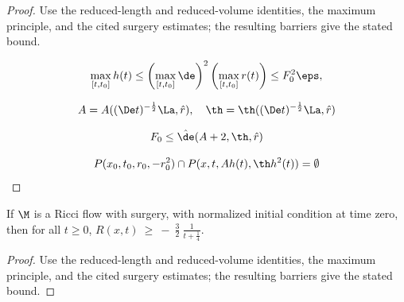 \begin{proof}
\sketch Use the reduced-length and reduced-volume identities, the maximum principle, and the cited surgery estimates; the resulting barriers give the stated bound.

\begin{equation}
\label{h<<r}
\max_{[t,t_0]}h(t)\leq \left(\max_{[t,t_0]}\de\right)^2
\left(\max_{[t,t_0]}r(t)\right)\leq F_0^2\eps,
\end{equation}

\begin{equation}
\label{aandthetaconditions}
A=A((\De t)^{-\frac12}\La,\hat r),\quad
\th=\th((\De t)^{-\frac12}\La,\hat r)
\end{equation}

\begin{equation}
\label{deltasmall}
 F_0\leq \hat\de(A+2,\th,\hat r)
\end{equation}

\begin{equation}
\label{p'sdisjoint}
P(x_0,t_0,r_0,-r_0^2)\cap P(x,t,Ah(t),\th h^2(t))=\emptyset
\end{equation}
\end{proof}

\begin{lemma}
  \label{lem:kl-establishing-noncollapsing-presence-surgery-vanishing-noncollapsing}
 \label{Rev}
If $\M$ is a Ricci flow with surgery, with normalized initial
condition at time zero, then for all $t \ge 0$, $R(x,t) \: \ge \:
- \: \frac{3}{2} \: \frac{1}{t+\frac14}$.
\end{lemma}

\begin{proof}
\sketch Use the reduced-length and reduced-volume identities, the maximum principle, and the cited surgery estimates; the resulting barriers give the stated bound.
\end{proof}

